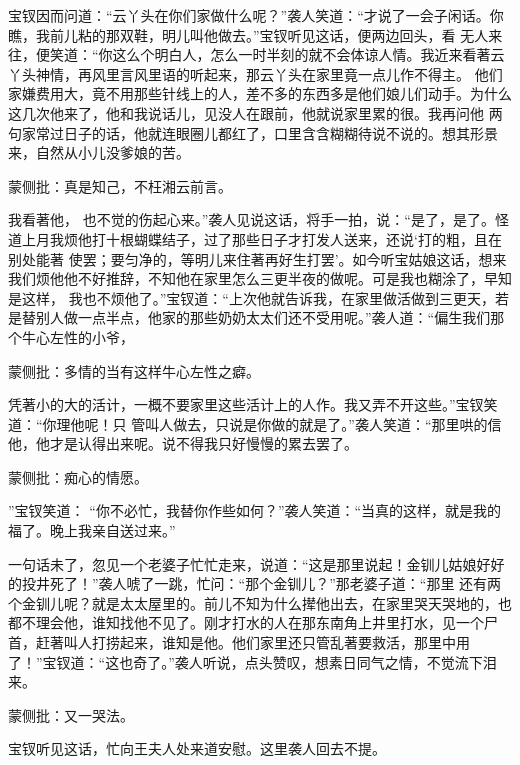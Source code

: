 \begin{parag}


    宝钗因而问道：“云丫头在你们家做什么呢？”袭人笑道：“才说了一会子闲话。你瞧，我前儿粘的那双鞋，明儿叫他做去。”宝钗听见这话，便两边回头，看 无人来往，便笑道：“你这么个明白人，怎么一时半刻的就不会体谅人情。我近来看著云丫头神情，再风里言风里语的听起来，那云丫头在家里竟一点儿作不得主。 他们家嫌费用大，竟不用那些针线上的人，差不多的东西多是他们娘儿们动手。为什么这几次他来了，他和我说话儿，见没人在跟前，他就说家里累的很。我再问他 两句家常过日子的话，他就连眼圈儿都红了，口里含含糊糊待说不说的。想其形景来，自然从小儿没爹娘的苦。\begin{note}蒙侧批：真是知己，不枉湘云前言。\end{note}我看著他， 也不觉的伤起心来。”袭人见说这话，将手一拍，说：“是了，是了。怪道上月我烦他打十根蝴蝶结子，过了那些日子才打发人送来，还说‘打的粗，且在别处能著 使罢；要匀净的，等明儿来住著再好生打罢’。如今听宝姑娘这话，想来我们烦他他不好推辞，不知他在家里怎么三更半夜的做呢。可是我也糊涂了，早知是这样， 我也不烦他了。”宝钗道：“上次他就告诉我，在家里做活做到三更天，若是替别人做一点半点，他家的那些奶奶太太们还不受用呢。”袭人道：“偏生我们那个牛心左性的小爷，\begin{note}蒙侧批：多情的当有这样牛心左性之癖。\end{note}凭著小的大的活计，一概不要家里这些活计上的人作。我又弄不开这些。”宝钗笑道：“你理他呢！只 管叫人做去，只说是你做的就是了。”袭人笑道：“那里哄的信他，他才是认得出来呢。说不得我只好慢慢的累去罢了。\begin{note}蒙侧批：痴心的情愿。\end{note}”宝钗笑道： “你不必忙，我替你作些如何？”袭人笑道：“当真的这样，就是我的福了。晚上我亲自送过来。”
\end{parag}


\begin{parag}


    一句话未了，忽见一个老婆子忙忙走来，说道：“这是那里说起！金钏儿姑娘好好的投井死了！”袭人唬了一跳，忙问：“那个金钏儿？”那老婆子道：“那里 还有两个金钏儿呢？就是太太屋里的。前儿不知为什么撵他出去，在家里哭天哭地的，也都不理会他，谁知找他不见了。刚才打水的人在那东南角上井里打水，见一个尸首，赶著叫人打捞起来，谁知是他。他们家里还只管乱著要救活，那里中用了！”宝钗道：“这也奇了。”袭人听说，点头赞叹，想素日同气之情，不觉流下泪 来。\begin{note}蒙侧批：又一哭法。\end{note}宝钗听见这话，忙向王夫人处来道安慰。这里袭人回去不提。
\end{parag}



